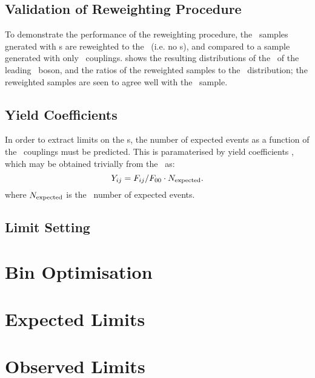 \subsection{Validation of Reweighting Procedure}

To demonstrate the performance of the reweighting procedure, the \sherpa\
samples gnerated with \TGC s are reweighted to the \sm\ (i.e. no \TGC s), and
compared to a sample generated with only \sm\ couplings. \fig{} shows the
resulting distributions of the \pt\ of the leading \Z\ boson, and the ratios of
the reweighted samples to the \sm\ distribution; the reweighted samples are seen
to agree well with the \sm\ sample.

\subsection{Yield Coefficients}

In order to extract limits on the \TGC s, the number of expected events as a
function of the \TGC\ couplings must be predicted. This is paramaterised by
yield coefficients \Yij, which may be obtained trivially from the \Fij\ as:
\begin{equation}
Y_{ij} = F_{ij}/F_{00}\cdot{N_{\rm expected}}.
\end{equation}
where $N_{\rm expected}$ is the \sm\ number of expected events.

\subsection{Limit Setting}

\section{Bin Optimisation}

\section{Expected Limits}

\section{Observed Limits}
